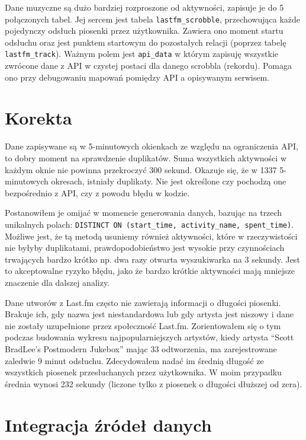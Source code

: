 \documentclass[openright]{xmgr}
\begin{document}
    Dane muzyczne są dużo bardziej rozproszone od aktywności, zapisuje je do 5 połączonych tabel.
    Jej sercem jest tabela \verb|lastfm_scrobble|, przechowująca każde pojedynczy odsłuch piosenki przez użytkownika.
    Zawiera ono moment startu odsłuchu oraz jest punktem startowym do pozostałych relacji (poprzez tabelę \verb|lastfm_track|).
    Ważnym polem jest \verb|api_data| w którym zapisuję wszystkie zwrócone dane z API w czystej postaci dla danego scrobbla (rekordu).
    Pomaga ono przy debugowaniu mapowań pomiędzy API a opisywanym serwisem.

    \section{Korekta}

        Dane zapisywane są w 5-minutowych okienkach ze względu na ograniczenia API, to dobry moment na sprawdzenie duplikatów.
        Suma wszystkich aktywności w każdym oknie nie powinna przekroczyć 300 sekund.
        Okazuje się, że w 1337 5-minutowych okresach, istniały duplikaty.
        Nie jest określone czy pochodzą one bezpośrednio z API, czy z powodu błędu w kodzie.

        Postanowiłem je omijać w momencie generowania danych, bazując na trzech unikalnych polach:
        \verb|DISTINCT ON (start_time, activity_name, spent_time)|.
        Możliwe jest, że tą metodą usuniemy również aktywności, które w rzeczywistości nie byłyby duplikatami,
        prawdopodobieństwo jest wysokie przy czynnościach trwających bardzo krótko np. dwa razy otwarta wyszukiwarka na 3 sekundy.
        Jest to akceptowalne ryzyko błędu, jako że bardzo krótkie aktywności mają mniejsze znaczenie dla dalszej analizy.

        Dane utworów z Last.fm często nie zawierają informacji o długości piosenki.
        Brakuje ich, gdy nazwa jest niestandardowa lub gdy artysta jest niszowy i dane nie zostały uzupełnione przez społeczność Last.fm.
        Zorientowałem się o tym podczas budowania wykresu najpopularniejszych artystów,
        kiedy artysta ``Scott BradLee's Postmodern Jukebox'' mając 33 odtworzenia, ma zarejestrowane zaledwie 9 minut odsłuchu.
        Zdecydowałem nadać im średnią długość ze wszystkich piosenek przesłuchanych przez użytkownika.
        W moim przypadku średnia wynosi 232 sekundy (liczone tylko z piosenek o długości dłuższej od zera).

    \section{Integracja źródeł danych}
\end{document}
